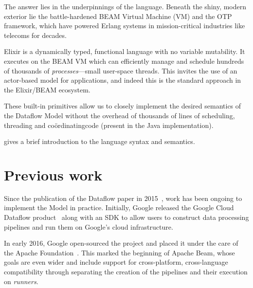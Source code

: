 The answer lies in the underpinnings of the language.
Beneath the shiny, modern exterior lie the battle-hardened BEAM Virtual Machine (VM) and the OTP framework, which have powered Erlang systems in mission-critical industries like telecoms for decades.

Elixir is a dynamically typed, functional language with no variable mutability. 
It executes on the BEAM VM which can efficiently manage and schedule hundreds of thousands of \emph{processes}---small user-space threads.
This invites the use of an actor-based model for applications, and indeed this is the standard approach in the Elixir/BEAM ecosystem.

These built-in primitives allow us to closely implement the desired semantics of the Dataflow Model without the overhead of thousands of lines of scheduling, threading and co\"ordinating\footnotemark[1] code (present in the Java implementation).


 gives a brief introduction to the language syntax and semantics.

\section{Previous work}\label{sec:intro:previous}
Since the publication of the Dataflow paper in 2015~\cite{Akidau:2015}, work has been ongoing to implement the Model in practice.
Initially, Google released the Google Cloud Dataflow product~\cite{CloudDataflow} along with an SDK to allow users to construct data processing pipelines and run them on Google's cloud infrastructure.

In early 2016, Google open-sourced the project and placed it under the care of the Apache Foundation~\cite{ApacheDataflowPost}.
This marked the beginning of Apache Beam, whose goals are even wider and include support for cross-platform, cross-language compatibility through separating the creation of the pipelines and their execution on \emph{runners}.

